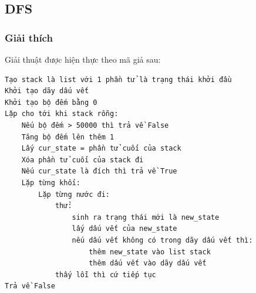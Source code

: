 \documentclass[a4paper, 11pt]{article}
\begin{document}
\subsection{DFS}
\subsubsection{Giải thích}
Giải thuật được hiện thực theo mã giả sau:
\begin{verbatim}
Tạo stack là list với 1 phần tử là trạng thái khởi đầu
Khởi tạo dãy dấu vết
Khởi tạo bộ đếm bằng 0
Lặp cho tới khi stack rỗng:
    Nếu bộ đếm > 50000 thì trả về False
    Tăng bộ đếm lên thêm 1
    Lấy cur_state = phần tử cuối của stack
    Xóa phần tử cuối của stack đi
    Nếu cur_state là đích thì trả về True
    Lặp từng khối:
        Lặp từng nước đi:
            thử:
                sinh ra trạng thái mới là new_state
                lấy dấu vết của new_state
                nếu dấu vết không có trong dãy dấu vết thì:
                    thêm new_state vào list stack
                    thêm dấu vết vào dãy dấu vết
            thấy lỗi thì cứ tiếp tục
Trả về False
\end{verbatim}
\end{document}
